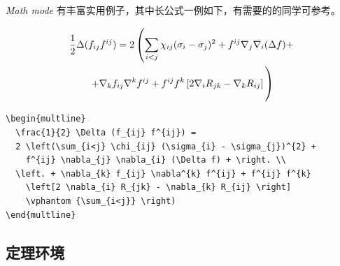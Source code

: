 \textit{Math mode} 有丰富实用例子，其中长公式一例如下，有需要的的同学可参考。

\begin{multline}
  \frac{1}{2} \Delta (f_{ij} f^{ij}) =
  2 \left(\sum_{i<j} \chi_{ij} (\sigma_{i} - \sigma_{j})^{2} +
    f^{ij} \nabla_{j} \nabla_{i} (\Delta f) + \right. \\
  \left. + \nabla_{k} f_{ij} \nabla^{k} f^{ij} + f^{ij} f^{k}
    \left[2 \nabla_{i} R_{jk} - \nabla_{k} R_{ij} \right]
    \vphantom {\sum_{i<j}} \right)
\end{multline}

\begin{lstlisting}[language={[LaTeX]TeX}, caption={长公式排版}]
\begin{multline}
  \frac{1}{2} \Delta (f_{ij} f^{ij}) =
  2 \left(\sum_{i<j} \chi_{ij} (\sigma_{i} - \sigma_{j})^{2} +
    f^{ij} \nabla_{j} \nabla_{i} (\Delta f) + \right. \\
  \left. + \nabla_{k} f_{ij} \nabla^{k} f^{ij} + f^{ij} f^{k}
    \left[2 \nabla_{i} R_{jk} - \nabla_{k} R_{ij} \right]
    \vphantom {\sum_{i<j}} \right)
\end{multline}
\end{lstlisting}

\subsection{定理环境}

